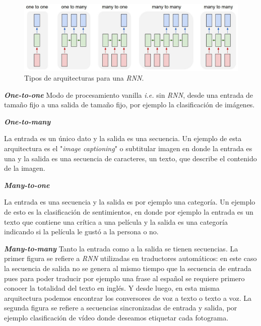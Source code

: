 \documentclass[a4paper,12pt]{article}
\begin{document}
\begin{figure}[H]
	\begin{center}				
		\includegraphics[width=1\textwidth]{rnnarch.jpg}
		\caption{Tipos de arquitecturas para una \textit{RNN}. \cite{karpathy:rnn}}
		\label{fig:rnnarch}
	\end{center}
\end{figure}

\textbf{\textit{One-to-one}}
Modo de procesamiento vanilla \textit{i.e.} sin \textit{RNN}, desde una entrada de tamaño fijo a una salida de tamaño fijo, por ejemplo la clasificación de imágenes.

\textbf{\textit{One-to-many}}

La entrada es un único dato y la salida es una secuencia. Un ejemplo de esta arquitectura es el "\textit{image captioning}" o subtitular imagen en donde la entrada es una y la salida es una secuencia de caracteres, un texto, que describe el contenido de la imagen.

\clearpage

\textbf{\textit{Many-to-one}}

La entrada es una secuencia y la salida es por ejemplo una categoría. Un ejemplo de esto es la clasificación de sentimientos, en donde por ejemplo la entrada es un texto que contiene una crítica a una película y la salida es una categoría indicando si la película le gustó a la persona o no.

\textbf{\textit{Many-to-many}}
Tanto la entrada como a la salida se tienen secuencias. La primer figura se refiere a \textit{RNN} utilizadas en traductores automáticos: en este caso la secuencia de salida no se genera al mismo tiempo que la secuencia de entrada pues para poder traducir por ejemplo una frase al español se requiere primero conocer la totalidad del texto en inglés. Y desde luego, en esta misma arquitectura podemos encontrar los conversores de voz a texto o texto a voz.
La segunda figura se refiere a secuencias sincronizadas de entrada y salida, por ejemplo clasificación de vídeo donde deseamos etiquetar cada fotograma.
\end{document}
